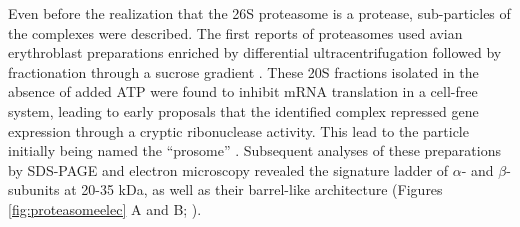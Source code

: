 	Even before the realization that the 26S proteasome is a protease, sub-particles of the complexes were described.  The first reports of proteasomes used avian erythroblast preparations enriched by differential ultracentrifugation followed by fractionation through a sucrose gradient \citep{schmid84}.  These 20S fractions isolated in the absence of added ATP were found to inhibit mRNA translation in a cell-free system, leading to early proposals that the identified complex repressed gene expression through a cryptic ribonuclease activity.  This lead to the particle initially being named the ``prosome'' \citep{kremp86, schmid84}.  Subsequent analyses of these preparations by SDS-PAGE and electron microscopy revealed the signature ladder of $\alpha$- and $\beta$-subunits at 20-35 kDa, as well as their barrel-like architecture (Figures \ref{fig:proteasomeelec} A and B; \citep{baumeister88, kremp86, schmid84}).
